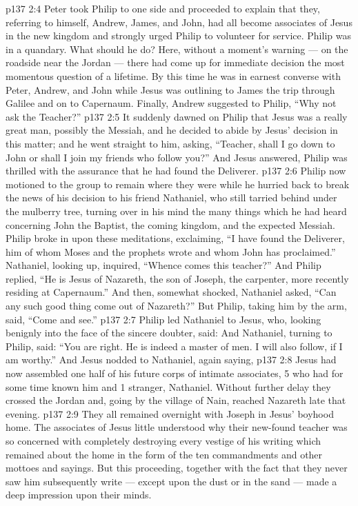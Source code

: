 \vs p137 2:4 Peter took Philip to one side and proceeded to explain that they, referring to himself, Andrew, James, and John, had all become associates of Jesus in the new kingdom and strongly urged Philip to volunteer for service. Philip was in a quandary. What should he do? Here, without a moment’s warning --- on the roadside near the Jordan --- there had come up for immediate decision the most momentous question of a lifetime. By this time he was in earnest converse with Peter, Andrew, and John while Jesus was outlining to James the trip through Galilee and on to Capernaum. Finally, Andrew suggested to Philip, “Why not ask the Teacher?”
\vs p137 2:5 It suddenly dawned on Philip that Jesus was a really great man, possibly the Messiah, and he decided to abide by Jesus’ decision in this matter; and he went straight to him, asking, “Teacher, shall I go down to John or shall I join my friends who follow you?” And Jesus answered,  Philip was thrilled with the assurance that he had found the Deliverer.
\vs p137 2:6 \pc Philip now motioned to the group to remain where they were while he hurried back to break the news of his decision to his friend Nathaniel, who still tarried behind under the mulberry tree, turning over in his mind the many things which he had heard concerning John the Baptist, the coming kingdom, and the expected Messiah. Philip broke in upon these meditations, exclaiming, “I have found the Deliverer, him of whom Moses and the prophets wrote and whom John has proclaimed.” Nathaniel, looking up, inquired, “Whence comes this teacher?” And Philip replied, “He is Jesus of Nazareth, the son of Joseph, the carpenter, more recently residing at Capernaum.” And then, somewhat shocked, Nathaniel asked, “Can any such good thing come out of Nazareth?” But Philip, taking him by the arm, said, “Come and see.”
\vs p137 2:7 Philip led Nathaniel to Jesus, who, looking benignly into the face of the sincere doubter, said:  And Nathaniel, turning to Philip, said: “You are right. He is indeed a master of men. I will also follow, if I am worthy.” And Jesus nodded to Nathaniel, again saying, 
\vs p137 2:8 \pc Jesus had now assembled one half of his future corps of intimate associates, 5 who had for some time known him and 1 stranger, Nathaniel. Without further delay they crossed the Jordan and, going by the village of Nain, reached Nazareth late that evening.
\vs p137 2:9 They all remained overnight with Joseph in Jesus’ boyhood home. The associates of Jesus little understood why their new\hyp{}found teacher was so concerned with completely destroying every vestige of his writing which remained about the home in the form of the ten commandments and other mottoes and sayings. But this proceeding, together with the fact that they never saw him subsequently write --- except upon the dust or in the sand --- made a deep impression upon their minds.

